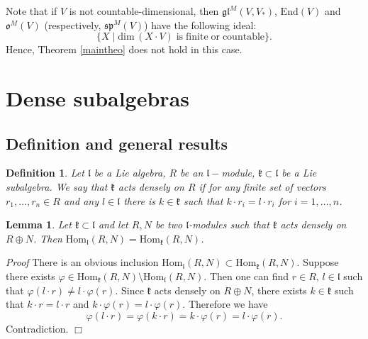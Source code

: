 \documentclass[10pt]{amsart}
\newcounter{theorem}
\newtheorem{lemma}[theo]{Lemma}
\renewenvironment{proof}{ \emph{Proof}}{$\Box$}
\newtheorem{defi}{Definition}[section]
\renewcommand{\sp}{\mathfrak{sp}}
\newcommand{\kk}{\mathfrak{k}}
\newcommand{\oo}{\mathfrak{o}}
\renewcommand{\ll}{\mathfrak{l}}
\renewcommand {\phi} {\varphi}
\newcommand{\gl}{\mathfrak{gl}}
\newcommand{\Hom}{\mathrm{Hom}}
\newcommand{\End}{\mathrm{End}}
\begin{document}
Note that if $V$ is not countable-dimensional, then $\gl^M(V,V_*)$, $\End(V)$ and  $\oo^M(V)$ (respectively, $\sp^M(V)$)  have the following ideal:
\begin{equation}\label{ideal}
\lbrace X \;|\; \mathrm{dim}\,(X\cdot V) \mathrm{\;is\;finite\;or\;countable}\rbrace.
\end{equation}
Hence, Theorem \ref{maintheo} does not hold in this case.

\vspace{0.33cm}

\section{Dense subalgebras}\label{sect:7}
\subsection {Definition and general results}\label{sect:7.1}
\begin{defi}\label{dense_salg}Let $\ll$ be a Lie algebra, $R$ be an $\ll-$module, $\kk\subset \ll$ be a Lie subalgebra. We say that $\kk$ acts \textit{densely}
on $R$ if for any finite set of vectors $r_1,\dots,r_n \in R$ and any $l\in \ll$ there is $k\in\kk$ such that $k\cdot r_i = l\cdot r_i$ for $i=1,\dots,n$.
\end{defi}

\begin{lemma}\label{denshom}  Let $\kk\subset\ll$ and let $R,N$ be two $\ll$-modules such that $\kk$ acts densely on $R\oplus N$. Then 
$\Hom_\ll(R,N)=\Hom_\kk(R,N)$.
\end{lemma}

\begin{proof} There is an obvious inclusion  $\Hom_\ll(R,N)\subset\Hom_\kk(R,N)$. Suppose there exists $\varphi\in \Hom_\kk(R,N)\setminus \Hom_\ll(R,N)$.
Then one can find $r\in R$, $l\in\ll$ such that $\varphi(l\cdot r)\neq l\cdot \phi(r)$. Since $\kk$ acts densely on $R \oplus N$,
there exists $k\in\kk$ such that $k \cdot r = l \cdot r$ and $k \cdot \varphi(r) = l \cdot \varphi (r)$.
Therefore we have
$$\phi(l \cdot r)=\varphi(k \cdot r)= k \cdot \phi(r) = l \cdot \phi(r).$$
Contradiction.
\end{proof}
\end{document}
